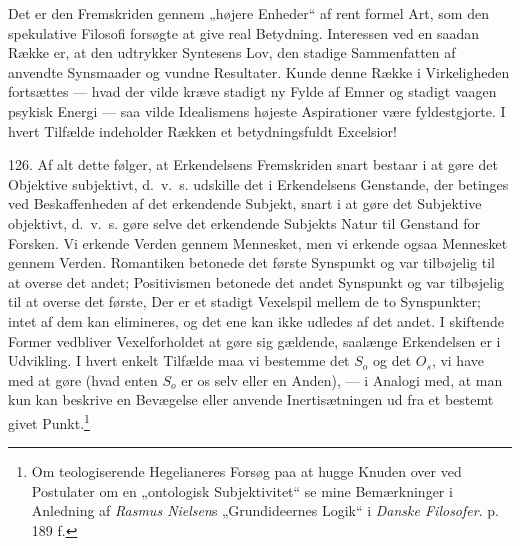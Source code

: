 \documentclass[12pt,a4paper]{book}
\newcommand{\opage}[1]{\marginnote{\footnotesize\textit{[#1]}}}
\begin{document}
Det er den Fremskriden gennem „højere Enheder“ af rent formel Art, som den spekulative
Filosofi forsøgte at give real Betydning. Interessen ved en saadan Række er, at den
udtrykker Syntesens Lov, den stadige Sammenfatten af anvendte Synsmaader og vundne
Resultater. Kunde denne Række i Virkeligheden fortsættes --- hvad der vilde kræve
stadigt ny Fylde af Emner og stadigt vaagen psykisk Energi --- saa vilde Idealismens
højeste Aspirationer være fyldestgjorte. I hvert Tilfælde indeholder Rækken et
betydningsfuldt Excelsior!

126. Af alt dette følger, at Erkendelsens Fremskriden
\opage{301} snart bestaar i at gøre det Objektive subjektivt, d.\ v.\ s. udskille det i
Erkendelsens Genstande, der betinges ved Beskaffenheden af det erkendende Subjekt,
snart i at gøre det Subjektive objektivt, d.\ v.\ s. gøre selve det erkendende
Subjekts Natur til Genstand for Forsken. Vi erkende Verden gennem Mennesket, men vi
erkende ogsaa Mennesket gennem Verden. Romantiken betonede det første Synspunkt og var
tilbøjelig til at overse det andet; Positivismen betonede det andet Synspunkt og var
tilbøjelig til at overse det første, Der er et stadigt Vexelspil mellem de to
Synspunkter; intet af dem kan elimineres, og det ene kan ikke udledes af det andet. I
skiftende Former vedbliver Vexelforholdet at gøre sig gældende, saalænge Erkendelsen er i
Udvikling. I hvert enkelt Tilfælde maa vi bestemme det $S_o$ og det $O_s$, vi have med
at gøre (hvad enten $S_o$ er os selv eller en Anden), --- i Analogi med, at man kun
kan beskrive en Bevægelse eller anvende Inertisætningen ud fra et bestemt givet
Punkt.\footnote{Om teologiserende Hegelianeres Forsøg paa at hugge Knuden over ved
Postulater om en „ontologisk Subjektivitet“ se mine Bemærkninger i Anledning af
\emph{Rasmus Nielsen}s „Grundideernes Logik“ i \emph{Danske Filosofer}. p. 189 f.}
\end{document}
